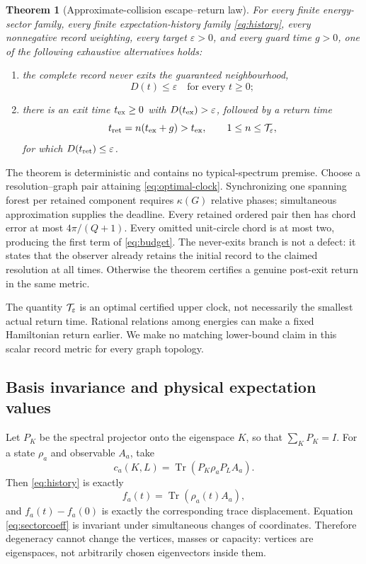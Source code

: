 \documentclass[10pt]{article}
\newtheorem{theorem}{Theorem}
\theoremstyle{definition}
\newcommand{\Tr}{\operatorname{Tr}}
\begin{document}
\begin{theorem}[Approximate-collision escape--return law]
\label{thm:master}
For every finite energy-sector family, every finite expectation-history
family \eqref{eq:history}, every nonnegative record weighting, every target
\(\varepsilon>0\), and every guard time \(g>0\), one of the following
exhaustive alternatives holds:
\begin{enumerate}[leftmargin=2.2em,label=(\roman*)]
 \item the complete record never exits the guaranteed neighbourhood,
 \[
   D(t)\le \varepsilon\quad\text{for every }t\geq0;
 \]
 \item there is an exit time \(t_{\rm ex}\geq0\) with
 \(D(t_{\rm ex})>\varepsilon\), followed by a return time
 \[
  t_{\rm ret}=n(t_{\rm ex}+g)>t_{\rm ex},
  \qquad
  1\le n\le{\cal T}_{\varepsilon},
  \label{eq:deadline}
 \]
 for which \(D(t_{\rm ret})\le \varepsilon\).
\end{enumerate}
\end{theorem}

The theorem is deterministic and contains no typical-spectrum premise.
Choose a resolution--graph pair attaining \eqref{eq:optimal-clock}.
Synchronizing one spanning forest per retained component requires
\(\kappa(G)\) relative phases; simultaneous approximation supplies the
deadline. Every retained ordered pair then has chord error at most
\(4\pi/(Q+1)\). Every omitted unit-circle chord is at most two, producing
the first term of \eqref{eq:budget}. The never-exits branch is not a defect:
it states that the observer already retains the initial record to the
claimed resolution at all times. Otherwise the theorem certifies a genuine
post-exit return in the same metric.

The quantity \({\cal T}_{\varepsilon}\) is an optimal certified upper clock,
not necessarily the smallest actual return time. Rational relations among
energies can make a fixed Hamiltonian return earlier. We make no matching
lower-bound claim in this scalar record metric for every graph topology.

\subsection*{Basis invariance and physical expectation values}

Let \(P_K\) be the spectral projector onto the eigenspace \(K\), so that
\(\sum_KP_K=I\). For a state \(\rho_a\) and observable \(A_a\), take
\begin{equation}
 c_a(K,L)=\Tr(P_K\rho_aP_LA_a).
 \label{eq:sectorcoeff}
\end{equation}
Then \eqref{eq:history} is exactly
\[
 f_a(t)=\Tr(\rho_a(t)A_a),
\]
and \(f_a(t)-f_a(0)\) is exactly the corresponding trace displacement.
Equation \eqref{eq:sectorcoeff} is invariant under simultaneous changes of
coordinates. Therefore degeneracy cannot change the vertices, masses or
capacity: vertices are eigenspaces, not arbitrarily chosen eigenvectors
inside them.
\end{document}
